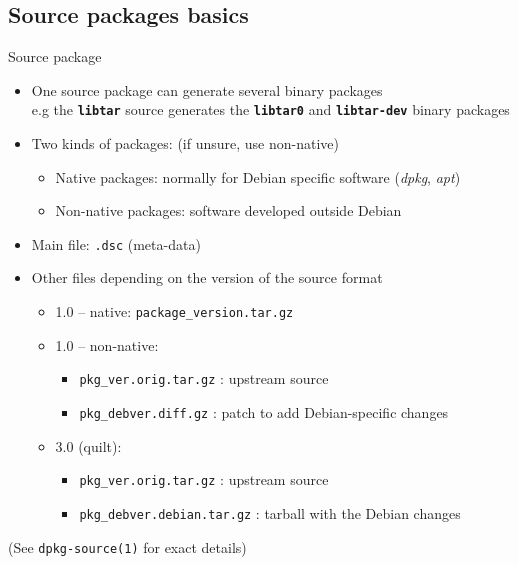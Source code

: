 \documentclass[10pt,final]{beamer}
\begin{document}
\subsection{Source packages basics}
\begin{frame}{Source package}
  \begin{itemize}
  \item One source package can generate several binary packages\\
    {\small e.g the \texttt{\bfseries libtar} source generates the
      \texttt{\bfseries libtar0} and \texttt{\bfseries libtar-dev} binary
      packages} \hbr
  \item Two kinds of packages: (if unsure, use non-native)
    \begin{itemize}
      \small
    \item Native packages: normally for Debian specific software (\textsl{dpkg}, \textsl{apt})
    \item Non-native packages: software developed outside Debian
    \end{itemize}
    \hbr
  \item Main file: \texttt{.dsc} (meta-data)
    \hbr
  \item Other files depending on the version of the source format
    \begin{itemize}
    \item 1.0 -- native: \texttt{package\_version.tar.gz}
      \hbr
    \item 1.0 -- non-native:
      \begin{itemize}
      \item \texttt{pkg\_ver.orig.tar.gz} : upstream source
      \item \texttt{pkg\_debver.diff.gz} : patch to add Debian-specific changes
      \end{itemize}
      \hbr
    \item 3.0 (quilt):
      \begin{itemize}
      \item \texttt{pkg\_ver.orig.tar.gz} : upstream source
      \item \texttt{pkg\_debver.debian.tar.gz} : tarball with the Debian changes
      \end{itemize}
    \end{itemize}
  \end{itemize}
  \br
  (See \texttt{dpkg-source(1)} for exact details)
\end{frame}
\end{document}
